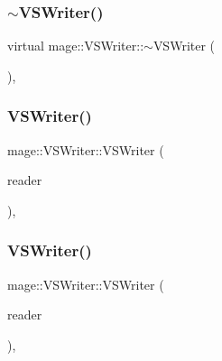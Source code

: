 \hypertarget{classmage_1_1_v_s_writer_ac2268dde1a58f0d1d657e584e33e82fe}{}\label{classmage_1_1_v_s_writer_ac2268dde1a58f0d1d657e584e33e82fe} 
\subsubsection{\texorpdfstring{$\sim$\+V\+S\+Writer()}{~VSWriter()}}
{\footnotesize\ttfamily virtual mage\+::\+V\+S\+Writer\+::$\sim$\+V\+S\+Writer (\begin{DoxyParamCaption}{ }\end{DoxyParamCaption})\hspace{0.3cm}{\ttfamily [virtual]}, {\ttfamily [default]}}

\hypertarget{classmage_1_1_v_s_writer_ac832695702725d55e8b5ded2917758d9}{}\label{classmage_1_1_v_s_writer_ac832695702725d55e8b5ded2917758d9} 
\subsubsection{\texorpdfstring{V\+S\+Writer()}{VSWriter()}\hspace{0.1cm}{\footnotesize\ttfamily [2/3]}}
{\footnotesize\ttfamily mage\+::\+V\+S\+Writer\+::\+V\+S\+Writer (\begin{DoxyParamCaption}\item[{const \hyperlink{classmage_1_1_v_s_writer}{V\+S\+Writer} \&}]{reader }\end{DoxyParamCaption})\hspace{0.3cm}{\ttfamily [private]}, {\ttfamily [delete]}}

\hypertarget{classmage_1_1_v_s_writer_a0ea80ce74f51eb63512b0fa13577bf30}{}\label{classmage_1_1_v_s_writer_a0ea80ce74f51eb63512b0fa13577bf30} 
\subsubsection{\texorpdfstring{V\+S\+Writer()}{VSWriter()}\hspace{0.1cm}{\footnotesize\ttfamily [3/3]}}
{\footnotesize\ttfamily mage\+::\+V\+S\+Writer\+::\+V\+S\+Writer (\begin{DoxyParamCaption}\item[{\hyperlink{classmage_1_1_v_s_writer}{V\+S\+Writer} \&\&}]{reader }\end{DoxyParamCaption})\hspace{0.3cm}{\ttfamily [private]}, {\ttfamily [delete]}}



